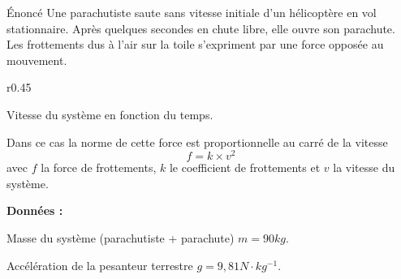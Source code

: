 



\newpage
\vspace*{-36pt}

\vspace{-12pt}
\begin{doc}{Énoncé}
  Une parachutiste saute sans vitesse initiale d'un hélicoptère en vol stationnaire.
  Après quelques secondes en chute libre, elle ouvre son parachute.
  Les frottements dus à l'air sur la toile s'expriment par une force opposée au mouvement. 

  \begin{wrapfigure}{r}{0.45\linewidth}
    \vspace*{-34pt}
    \begin{center}
      \small{
        Vitesse du système en fonction du temps.
      }
    \end{center}
  \end{wrapfigure}
  
  Dans ce cas la norme de cette force est proportionnelle au carré de la vitesse
  \begin{equation*}
    f = k \times v^2
  \end{equation*}
  avec $f$ la force de frottements, $k$ le coefficient de frottements et $v$ la vitesse du système.

  \textbf{Données :}
  \begin{listePoints}
    \item Masse du système (parachutiste + parachute) $m = 90\unit{kg}$.
    \item Accélération de la pesanteur terrestre $g = 9,\!81 \unit{N \cdot kg^{-1}}$.
  \end{listePoints}
\end{doc}





